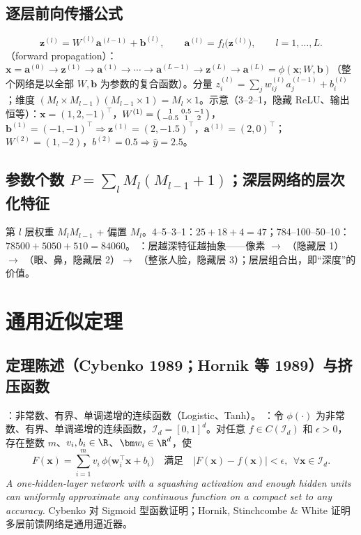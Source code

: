 \subsection{逐层前向传播公式}
\[
\bm z^{(l)}=W^{(l)}\bm a^{(l-1)}+\bm b^{(l)},\qquad \bm a^{(l)}=f_l\big(\bm z^{(l)}\big),\qquad l=1,\dots,L .
\]
（forward propagation）：$\bm x=\bm a^{(0)}\to\bm z^{(1)}\to\bm a^{(1)}\to\cdots\to\bm a^{(L-1)}\to\bm z^{(L)}\to\bm a^{(L)}=\phi(\bm x;W,\bm b)$（整个网络是以全部 $W,\bm b$ 为参数的复合函数）。分量 $z_i^{(l)}=\sum_{j}w^{(l)}_{ij}a^{(l-1)}_j+b^{(l)}_i$；维度 $(M_l\times M_{l-1})(M_{l-1}\times1)=M_l\times1$。示意（3--2--1，隐藏 ReLU、输出恒等）：$\bm x=(1,2,-1)^\top$，$W^{(1)}=\begin{psmallmatrix}1&0.5&-1\\-0.5&1&2\end{psmallmatrix}$，$\bm b^{(1)}=(-1,-1)^\top\Rightarrow\bm z^{(1)}=(2,-1.5)^\top$，$\bm a^{(1)}=(2,0)^\top$；$W^{(2)}=(1,-2)$，$b^{(2)}=0.5\Rightarrow\hat y=2.5$。

\subsection{参数个数 \texorpdfstring{$P=\sum_l M_l(M_{l-1}+1)$}{P=sum M_l(M_{l-1}+1)}；深层网络的层次化特征}
第 $l$ 层权重 $M_lM_{l-1}$ + 偏置 $M_l$。4--5--3--1：$25+18+4=47$；784--100--50--10：$78500+5050+510=84060$。
：层越深特征越抽象——像素 $\to$ （隐藏层 1）$\to$ （眼、鼻，隐藏层 2）$\to$ （整张人脸，隐藏层 3）；层层组合出，即“深度”的价值。

\section{通用近似定理}

\subsection{定理陈述（Cybenko 1989；Hornik 等 1989）与挤压函数}
：非常数、有界、单调递增的连续函数（Logistic、Tanh）。
：令 $\phi(\cdot)$ 为非常数、有界、单调递增的连续函数，$\mathcal I_d=[0,1]^d$。对任意 $f\in C(\mathcal I_d)$ 和 $\epsilon>0$，存在整数 $m$、$v_i,b_i\in\R$、$\bm w_i\in\R^d$，使
\[
F(\bm x)=\sum_{i=1}^m v_i\,\phi\big(\bm w_i^\top\bm x+b_i\big)\quad\text{满足}\quad |F(\bm x)-f(\bm x)|<\epsilon,\ \ \forall\bm x\in\mathcal I_d .
\]
\textit{A one-hidden-layer network with a squashing activation and enough hidden units can uniformly approximate any continuous function on a compact set to any accuracy.} Cybenko 对 Sigmoid 型函数证明；Hornik, Stinchcombe \& White 证明多层前馈网络是通用逼近器。

